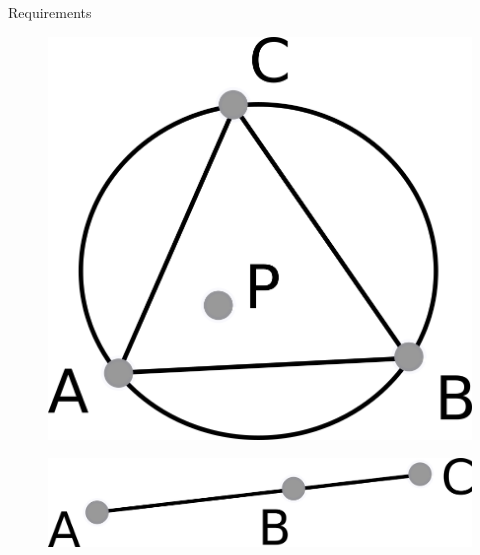 \documentclass[18pt]{beamer}
\begin{document}
\begin{frame}{Requirements}
\begin{minipage}{.4\textwidth}
\begin{overprint}
   \begin{figure}
  \centering
  \includegraphics[scale=1.3]{incircle}
\end{figure}   
  \vspace{1.3 cm}
   \begin{figure}
  \centering
  \includegraphics[scale=1.3]{isonline}
\end{figure}  
 \end{overprint}

\end{minipage}

\end{frame}
\end{document}
